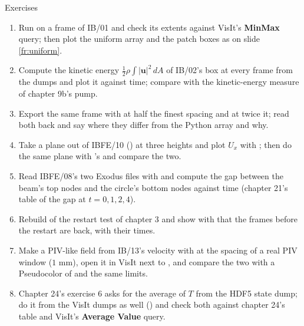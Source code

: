 \documentclass[aspectratio=169,11pt]{beamer}
\newcommand{\gui}[1]{\textsf{\textbf{#1}}}
\begin{document}
\begin{frame}{Exercises}
\label{fr:exercises}
\footnotesize
\begin{enumerate}
  \item Run  on a frame of IB/01 and check its  extents against VisIt's \gui{MinMax} query; then plot the uniform array and the patch boxes as on slide \ref{fr:uniform}.
  \item Compute the kinetic energy $\frac12 \rho \int |\mathbf{u}|^2\,dA$ of IB/02's box at every frame from the dumps and plot it against time; compare with the kinetic-energy measure of chapter 9b's pump.
  \item Export the same frame with  at half the finest spacing and at twice it; read both back and say where they differ from the Python array and why.
  \item Take a plane out of IBFE/10 () at three heights and plot $U_x$ with ; then do the same plane with 's  and compare the two.
  \item Read IBFE/08's two Exodus files with  and compute the gap between the beam's top nodes and the circle's bottom nodes against time (chapter 21's table of the gap at $t = 0, 1, 2, 4$).
  \item Rebuild  of the restart test of chapter 3 and show with  that the frames before the restart are back, with their times.
  \item Make a PIV-like field from IB/13's velocity with  at the spacing of a real PIV window ($1$ mm), open it in VisIt next to , and compare the two with a Pseudocolor of  and the same limits.
  \item Chapter 24's exercise 6 asks for the average of $T$ from the HDF5 state dump; do it from the VisIt dumps as well () and check both against chapter 24's table and VisIt's \gui{Average Value} query.
\end{enumerate}
\end{frame}
\end{document}
